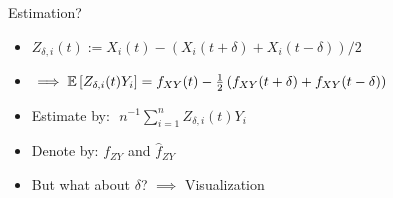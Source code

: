 % 
% 
% 
% 


% 
% 


\begin{frame}{Estimation?}
    \begin{itemize}
    \setlength\itemsep{1.5em}
        \item[\labelitem] $Z_{\delta, i}(t) := X_i(t) - \left(X_i(t + \delta) + X_i(t -
            \delta)\right) / 2$
        \item[\labelitem] $\implies \mathbb{E}\left[Z_{\delta, i}(t) Y_i\right] = f_{XY}(t) -
            \frac{1}{2}\left(f_{XY}(t + \delta) + f_{XY}(t - \delta)\right)$
        \item[\labelitem] Estimate by: $\,\, n^{-1}\sum_{i=1}^n Z_{\delta, i}(t) Y_i$
        \item[\labelitem] Denote by: $f_{ZY}$ and $\hat{f}_{ZY}$
        \item[\labelitem] But what about $\delta$? $\implies$ Visualization
    \end{itemize}
\end{frame}
